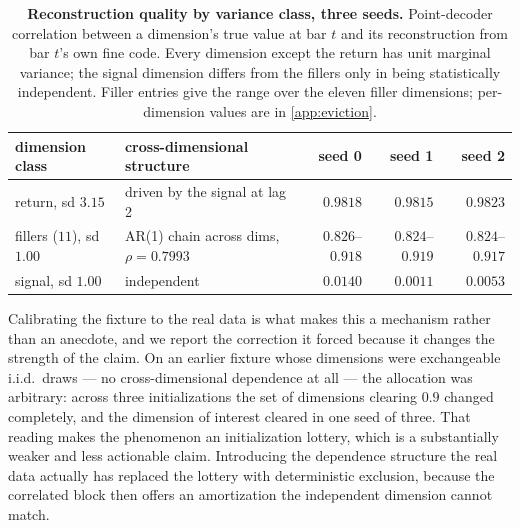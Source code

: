 \begin{table}[t]
  \centering
  \small
  \caption{\textbf{Reconstruction quality by variance class, three seeds.} Point-decoder
  correlation between a dimension's true value at bar $t$ and its reconstruction from bar $t$'s own
  fine code. Every dimension except the return has unit marginal variance; the signal dimension
  differs from the fillers only in being statistically independent. Filler entries give the range
  over the eleven filler dimensions; per-dimension values are in \cref{app:eviction}.}
  \label{tab:eviction}
  \begin{tabular}{@{}llrrr@{}}
    \toprule
    dimension class & cross-dimensional structure & seed 0 & seed 1 & seed 2 \\
    \midrule
    return, sd $3.15$         & driven by the signal at lag 2            & $0.9818$ & $0.9815$ & $0.9823$ \\
    fillers ($11$), sd $1.00$ & AR(1) chain across dims, $\rho = 0.7993$ & $0.826$--$0.918$ & $0.824$--$0.919$ & $0.824$--$0.917$ \\
    signal, sd $1.00$         & independent                              & $\mathbf{0.0140}$ & $\mathbf{0.0011}$ & $\mathbf{0.0053}$ \\
    \bottomrule
  \end{tabular}
\end{table}

Calibrating the fixture to the real data is what makes this a mechanism rather than an anecdote,
and we report the correction it forced because it changes the strength of the claim. On an earlier
fixture whose dimensions were exchangeable i.i.d.\ draws --- no cross-dimensional dependence at all
--- the allocation was arbitrary: across three initializations the set of dimensions clearing $0.9$
changed completely, and the dimension of interest cleared in one seed of three.
That reading makes the phenomenon an initialization lottery, which is a substantially weaker and
less actionable claim. Introducing the dependence structure the real data actually has replaced the
lottery with deterministic exclusion, because the correlated block then offers an amortization the
independent dimension cannot match.

